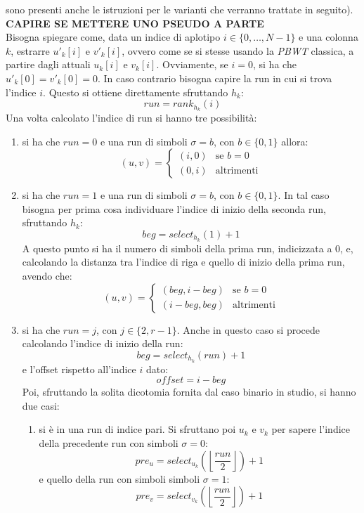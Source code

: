 sono presenti anche le istruzioni per le varianti che verranno trattate in
seguito).\\
\textbf{CAPIRE SE METTERE UNO PSEUDO A PARTE}\\
Bisogna spiegare come, data un indice di aplotipo $i\in\{0,\ldots,N-1\}$ e una
colonna $k$, estrarre $u'_k[i]$ e $v'_k[i]$, ovvero come se si stesse usando la
\textit{PBWT} classica, a partire dagli attuali $u_k[i]$ e $v_k[i]$. Ovviamente,
se $i=0$, si ha che $u'_k[0]=v'_k[0]=0$. In caso contrario bisogna capire la run
in cui si trova l'indice $i$. Questo si ottiene direttamente sfruttando $h_k$:
\[run = rank_{h_k}(i)\]
Una volta calcolato l'indice di run si hanno tre possibilità:
\begin{enumerate}
  \item si ha che $run=0$ e una run di simboli $\sigma=b$, con $b\in\{0,1\}$
  allora:
  \[(u,v)=
    \begin{cases}
      (i,0)&\mbox{se } b=0\\
      (0,i)&\mbox{altrimenti}
    \end{cases}
  \]
  \item si ha che $run=1$ e una run di simboli $\sigma=b$, con $b\in\{0,1\}$. In
  tal caso bisogna per prima cosa individuare l'indice di inizio della seconda
  run, sfruttando $h_k$:
  \[beg = select_{h_k}(1)+1\]
  A questo punto si ha il numero di simboli della prima run, indicizzata a 0, e,
  calcolando la distanza tra l'indice di riga e quello di inizio della prima
  run, avendo che:
  \[(u,v)=
    \begin{cases}
      (beg,i-beg)&\mbox{se } b=0\\
      (i-beg,beg)&\mbox{altrimenti}
    \end{cases}
  \]
  \item si ha che $run=j$, con $j\in\{2,r-1\}$. Anche in questo caso  si procede
  calcolando l'indice di inizio della run:
  \[beg = select_{h_k}(run)+1\]
  e l'offset rispetto all'indice $i$ dato:
  \[offset = i-beg\]
  Poi, sfruttando la solita dicotomia fornita dal caso binario in studio, si
  hanno due casi: 
  \begin{enumerate}
    \item si è in una run di indice pari.
    Si sfruttano poi $u_k$ e $v_k$ per sapere l'indice della precedente run con
    simboli $\sigma=0$:
    \[pre_u=select_{u_k}\left(\left\lfloor\frac{run}{2}\right\rfloor\right)+1\]
    e quello della run con simboli simboli $\sigma=1$:
    \[pre_v=select_{v_k}\left(\left\lfloor\frac{run}{2}\right\rfloor\right)+1\]

\end{enumerate}
\end{enumerate}
